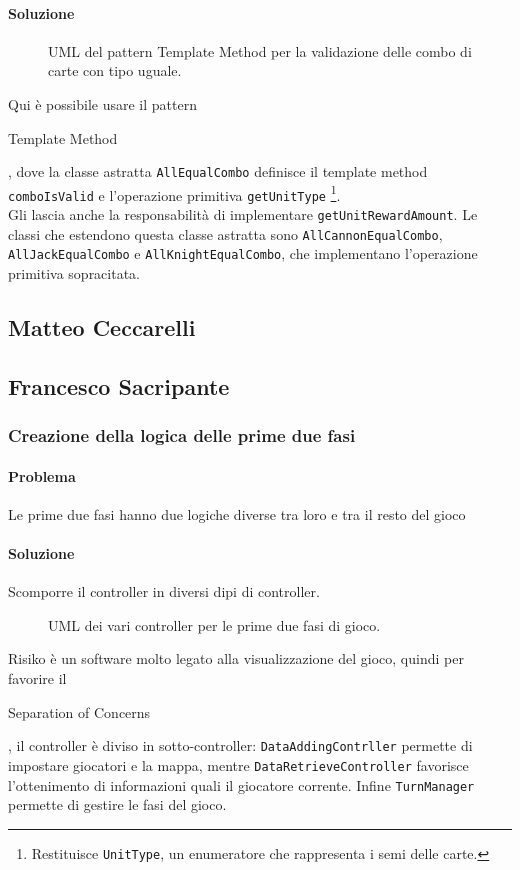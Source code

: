 \documentclass[a4paper,12pt]{report}
\begin{document}
\paragraph{Soluzione}
\begin{figure}[H]
	\centering
	
	\caption{UML del pattern Template Method per la validazione delle combo di carte con tipo uguale.}
\end{figure}
Qui è possibile usare il pattern \begin{itshape}Template Method\end{itshape}, dove la classe astratta \texttt{AllEqualCombo} definisce il template method \texttt{comboIsValid} e l'operazione primitiva \texttt{getUnitType} \footnote{Restituisce \texttt{UnitType}, un enumeratore che rappresenta i semi delle carte.}.
\\
Gli lascia anche la responsabilità di implementare \texttt{getUnitRewardAmount}. Le classi che estendono questa classe astratta sono \texttt{AllCannonEqualCombo}, \texttt{AllJackEqualCombo} e \texttt{AllKnightEqualCombo}, che implementano l'operazione primitiva sopracitata.

\subsection{Matteo Ceccarelli}
\subsection{Francesco Sacripante}
\subsubsection{Creazione della logica delle prime due fasi}
\paragraph{Problema}
Le prime due fasi hanno due logiche diverse tra loro e tra il resto del gioco
\paragraph{Soluzione}
Scomporre il controller in diversi dipi di controller.
\begin{figure}[H]
	\centering
	
	\caption{UML dei vari controller per le prime due fasi di gioco.}
\end{figure}
Risiko è un software molto legato alla visualizzazione del gioco, quindi per favorire il \begin{itshape}Separation of Concerns\end{itshape}, il controller è diviso in sotto-controller: \texttt{DataAddingContrller} permette di impostare giocatori e la mappa, mentre \texttt{DataRetrieveController} favorisce l'ottenimento di informazioni quali il giocatore corrente. Infine \texttt{TurnManager} permette di gestire le fasi del gioco.
\end{document}
